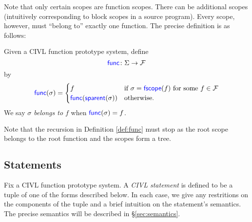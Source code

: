 \documentclass[11pt]{article}
\begin{document}
Note that only certain scopes are function scopes.  There can be
additional scopes (intuitively corresponding to block scopes in a
source program).  Every scope, however, must ``belong to'' exactly one
function.  The precise definition is as follows:
\begin{definition}
  \label{def:func}
  Given a CIVL function prototype system, define
  \[
  \textsf{\textcolor{blue}{\textup{func}}} \colon \Sigma \rightarrow \mathcal{F} 
  \]
  by
  \[
  \textsf{\textcolor{blue}{\textup{func}}}(\sigma)=
  \begin{cases}
    f & \text{if $\sigma=\textsf{\textcolor{blue}{\textup{fscope}}}(f)$ for some $f\in\mathcal{F}$}\\
    \textsf{\textcolor{blue}{\textup{func}}}(\textsf{\textcolor{blue}{\textup{sparent}}}(\sigma)) & \text{otherwise.}
  \end{cases}
  \]
  We say \emph{$\sigma$ belongs to $f$}  when $\textsf{\textcolor{blue}{\textup{func}}}(\sigma)=f$.
\end{definition}
Note that the recursion in Definition \ref{def:func} must stop as the
root scope belongs to the root function and the scopes form a tree.


\subsection{Statements}

Fix a CIVL function prototype system.  A \emph{CIVL statement} is
defined to be a tuple of one of the forms described below.
In each case, we give any restritions on the components of the tuple
and a brief intuition on the statement's semantics.  The precise
semantics will be described in \S\ref{sec:semantics}.
\end{document}
